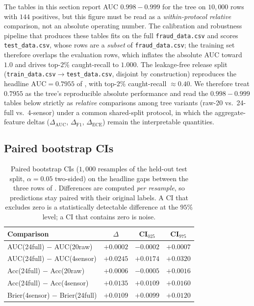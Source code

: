 The tables in this section report AUC $0.998{-}0.999$ for the tree on
$10{,}000$ rows with $144$ positives, but this figure must be read as a
\emph{within-protocol relative} comparison, not an absolute operating
number. The calibration and robustness pipeline that produces these tables
fits on the full \texttt{fraud\_data.csv} and scores
\texttt{test\_data.csv}, whose rows are a \emph{subset} of
\texttt{fraud\_data.csv}; the training set therefore overlaps the
evaluation rows, which inflates the absolute AUC toward $1.0$ and drives
top-$2\%$ caught-recall to $1.000$. The leakage-free release split
(\texttt{train\_data.csv}$\to$\texttt{test\_data.csv}, disjoint by
construction) reproduces the headline $\mathrm{AUC}{=}0.7955$ of
, with top-$2\%$ caught-recall $\approx 0.40$. We
therefore treat $0.7955$ as the tree's reproducible absolute performance
and read the $0.998{-}0.999$ tables below strictly as \emph{relative}
comparisons among tree variants (raw-20 vs.\ 24-full vs.\ 4-sensor) under a
common shared-split protocol, in which the aggregate-feature deltas
($\Delta_{\mathrm{AUC}}$, $\Delta_{\mathrm{F1}}$, $\Delta_{\mathrm{ECE}}$)
remain the interpretable quantities.

\subsection{Paired bootstrap CIs}

\begin{table}[t]
\centering
\small
\caption{Paired bootstrap CIs ($1{,}000$ resamples of the held-out test
split, $\alpha{=}0.05$ two-sided) on the headline gaps between the three
rows of . Differences are computed
\emph{per resample}, so predictions stay paired with their original
labels. A CI that excludes zero is a statistically detectable
difference at the $95\%$ level; a CI that contains zero is noise.}
\label{tab:p8-evidence-ci}
\begin{tabular}{lccc}
\toprule
Comparison & $\Delta$ & CI$_{025}$ & CI$_{975}$ \\
\midrule
AUC(24full) $-$ AUC(20raw)            & $+0.0002$ & $-0.0002$ & $+0.0007$ \\
AUC(24full) $-$ AUC(4sensor)          & $+0.0245$ & $+0.0174$ & $+0.0320$ \\
Acc(24full) $-$ Acc(20raw)            & $+0.0006$ & $-0.0005$ & $+0.0016$ \\
Acc(24full) $-$ Acc(4sensor)          & $+0.0135$ & $+0.0109$ & $+0.0160$ \\
Brier(4sensor) $-$ Brier(24full)      & $+0.0109$ & $+0.0099$ & $+0.0120$ \\
\bottomrule
\end{tabular}
\end{table}

